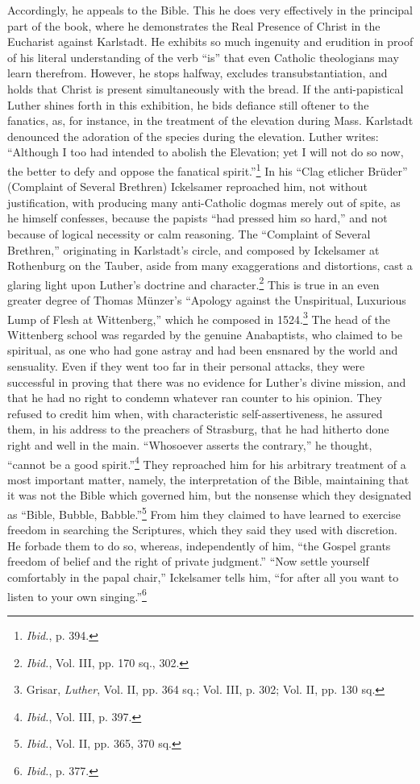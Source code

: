 Accordingly, he appeals to the Bible. This he does very effectively
in the principal part of the book, where he demonstrates the Real
Presence of Christ in the Eucharist against Karlstadt. He exhibits so
much ingenuity and erudition in proof of his literal understanding
of the verb “is” that even Catholic theologians may learn therefrom.
However, he stops halfway, excludes transubstantiation, and holds
that Christ is present simultaneously with the bread. If the anti-papistical
Luther shines forth in this exhibition, he bids defiance still
oftener to the fanatics, as, for instance, in the treatment of the elevation
during Mass. Karlstadt denounced the adoration of the species
during the elevation. Luther writes: “Although I too had intended to
abolish the Elevation; yet I will not do so now, the better to defy and
oppose the fanatical spirit.”\footnote{\textit{Ibid.}, p. 394.}
In his “Clag etlicher Brüder” (Complaint
of Several Brethren) Ickelsamer reproached him, not without
justification, with producing many anti-Catholic dogmas merely out
of spite, as he himself confesses, because the papists “had pressed him
so hard,” and not because of logical necessity or calm reasoning.
The “Complaint of Several Brethren,” originating in Karlstadt’s
circle, and composed by Ickelsamer at Rothenburg on the Tauber,
aside from many exaggerations and distortions, cast a glaring light upon
Luther’s doctrine and character.\footnote{\textit{Ibid.}, Vol. III, pp. 170 sq., 302.}
This is true in an even greater
degree of Thomas Münzer’s “Apology against the Unspiritual, Luxurious
Lump of Flesh at Wittenberg,” which he composed in 1524.\footnote
{Grisar, \textit{Luther}, Vol. II, pp. 364 sq.; Vol. III, p. 302; Vol. II, pp. 130 sq.}
The head of the Wittenberg school was regarded by the genuine
Anabaptists, who claimed to be spiritual, as one who had gone astray
and had been ensnared by the world and sensuality. Even if they went
too far in their personal attacks, they were successful in proving
that there was no evidence for Luther’s divine mission, and that he had
no right to condemn whatever ran counter to his opinion. They refused
to credit him when, with characteristic self-assertiveness, he
assured them, in his address to the preachers of Strasburg, that he had
hitherto done right and well in the main. “Whosoever asserts the contrary,”
he thought, “cannot be a good spirit.”\footnote{\textit{Ibid.}, Vol. III, p. 397.}
They reproached
him for his arbitrary treatment of a most important matter, namely,
the interpretation of the Bible, maintaining that it was not the Bible
which governed him, but the nonsense which they designated as “Bible,
Bubble, Babble.”\footnote{\textit{Ibid.}, Vol. II, pp. 365, 370 sq.}
From him they claimed to have learned to exercise
freedom in searching the Scriptures, which they said they used with
discretion. He forbade them to do so, whereas, independently of him,
“the Gospel grants freedom of belief and the right of private judgment.”
“Now settle yourself comfortably in the papal chair,” Ickelsamer tells
him, “for after all you want to listen to your own singing.”\footnote{\textit{Ibid.}, p. 377.}

